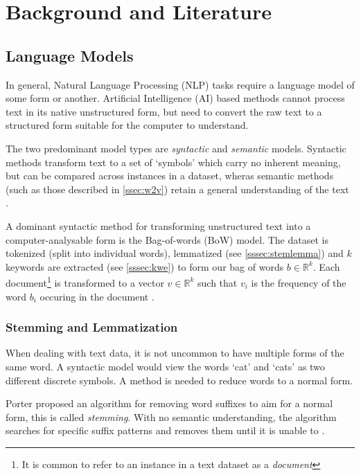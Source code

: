 \section{Background and Literature}\label{sec:lit}

\subsection{Language Models}\label{ssec:kwe}
In general, Natural Language Processing (NLP) tasks require a language model of some form or another.
Artificial Intelligence (AI) based methods cannot process text in its native unstructured form, but need to convert the
raw text to a structured form suitable for the computer to understand.

The two predominant model types are \emph{syntactic} and \emph{semantic} models. 
Syntactic methods transform text to a set of `symbols' which carry no inherent meaning, but can be 
compared across instances in a dataset, wheras semantic methods (such as those described in \autoref{ssec:w2v})
retain a general understanding of the text \cite{Cambria2014}.

A dominant syntactic method for transforming unstructured text into a computer-analysable form is the Bag-of-words 
(BoW) model. 
The dataset is tokenized (split into individual words), lemmatized (see \autoref{sssec:stemlemma})
and $k$ keywords are extracted (see \autoref{sssec:kwe}) to form our bag of words $b\in \mathbb{R} ^{k}$.
Each document\footnote{It is common to refer to an instance in a text dataset as a \emph{document}} is
transformed to a vector $v\in \mathbb{R} ^{k}$ such that $v_i$ is the frequency 
of the word $b_i$ occuring in the document \cite{Cambria2014, StevenBirdEwanKlein2009, Zhang2010}.

\subsubsection{Stemming and Lemmatization}\label{sssec:stemlemma}
When dealing with text data, it is not uncommon to have multiple forms of the same word.  A syntactic model would view
the words `cat' and `cats' as two different discrete symbols.  A method is needed to reduce words to a normal form.

Porter proposed an algorithm for removing word suffixes to aim for a normal form, this is called
\emph{stemming}. With no semantic understanding, the algorithm searches for specific suffix patterns and removes them
until it is unable to \cite{Porter1980}.


